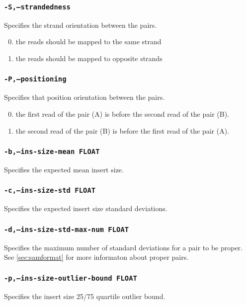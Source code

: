 \documentclass[a4paper,12pt]{book}
\newcommand{\TT}[1]{{\tt #1}} %
\begin{document}
\subsubsection{\TT{-S,--strandedness}}
Specifies the strand orientation between the pairs.
\begin{enumerate}
	\setcounter{enumi}{-1} %
	\item the reads should be mapped to the same strand
	\item the reads should be mapped to opposite strands
\end{enumerate}

\subsubsection{\TT{-P,--positioning}}
Specifies that position orientation between the pairs.
\begin{enumerate}
	\setcounter{enumi}{-1} %
	\item the first read of the pair (A) is before the second read of the pair (B).
	\item the second read of the pair (B) is before the first read of the pair (A).
\end{enumerate}

\subsubsection{\TT{-b,--ins-size-mean FLOAT}}
Specifies the expected mean insert size.

\subsubsection{\TT{-c,--ins-size-std FLOAT}}
Specifies the expected insert size standard deviations.

\subsubsection{\TT{-d,--ins-size-std-max-num FLOAT}}
Specifies the maximum number of standard deviations for a pair to be proper.
See \autoref{sec:samformat} for more informaton about proper pairs.


\subsubsection{\TT{-p,--ins-size-outlier-bound FLOAT}}
Specifies the insert size 25/75 quartile outlier bound.
\end{document}
